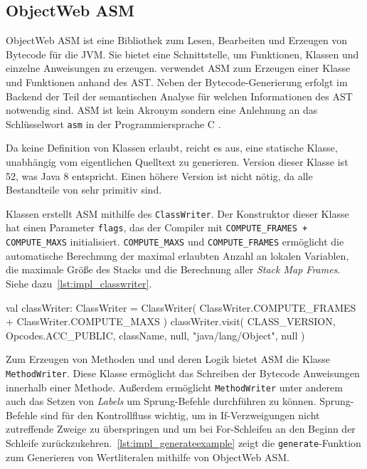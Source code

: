 \subsection{ObjectWeb ASM}

ObjectWeb ASM ist eine Bibliothek zum Lesen, Bearbeiten und Erzeugen von Bytecode für die JVM. Sie bietet eine Schnittstelle, um Funktionen, Klassen und einzelne Anweisungen zu erzeugen. \Toya verwendet ASM zum Erzeugen einer Klasse und Funktionen anhand des AST. Neben der Bytecode-Generierung erfolgt im Backend der Teil der semantischen Analyse für welchen Informationen des AST notwendig sind. ASM ist kein Akronym sondern eine Anlehnung an das Schlüsselwort \texttt{asm} in der Programmiersprache C \parencite{bruneton2002asm}.

Da \toya keine Definition von Klassen erlaubt, reicht es aus, eine statische Klasse, unabhängig vom eigentlichen Quelltext zu generieren. Version dieser Klasse ist 52, was Java 8 entspricht. Einen höhere Version ist nicht nötig, da alle Bestandteile von \toya sehr primitiv sind.

Klassen erstellt ASM mithilfe des \texttt{ClassWriter}. Der Konstruktor dieser Klasse hat einen Parameter \texttt{flags}, das der \toya Compiler mit \texttt{COMPUTE\_FRAMES + COMPUTE\_MAXS} initialisiert. \texttt{COMPUTE\_MAXS} und \texttt{COMPUTE\_FRAMES} ermöglicht die automatische Berechnung der maximal erlaubten Anzahl an lokalen Variablen, die maximale Größe des Stacks und die Berechnung aller \textit{Stack Map Frames}. Siehe dazu~\autoref{lst:impl_classwriter}.

\begin{KotlinCode}[numbers=none, caption={Erstellung einer Klasse mithilfe ObjectWeb ASM}, label=lst:impl_classwriter]
val classWriter: ClassWriter = ClassWriter(
    ClassWriter.COMPUTE_FRAMES + ClassWriter.COMPUTE_MAXS
)
classWriter.visit(
    CLASS_VERSION,
    Opcodes.ACC_PUBLIC,
    className,
    null,
    "java/lang/Object",
    null
)
\end{KotlinCode}

Zum Erzeugen von Methoden und und deren Logik bietet ASM die Klasse \texttt{MethodWriter}. Diese Klasse ermöglicht das Schreiben der Bytecode Anweisungen innerhalb einer Methode. Außerdem ermöglicht \texttt{MethodWriter} unter anderem auch das Setzen von \textit{Labels} um Sprung-Befehle durchführen zu können. Sprung-Befehle sind für den Kontrollfluss wichtig, um in If-Verzweigungen nicht zutreffende Zweige zu überspringen und um bei For-Schleifen an den Beginn der Schleife zurückzukehren.~\autoref{lst:impl_generateexample} zeigt die \texttt{generate}-Funktion zum Generieren von Wertliteralen mithilfe von ObjectWeb ASM.

